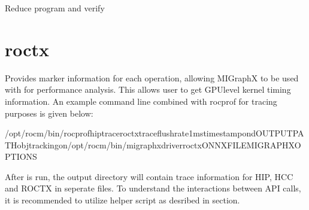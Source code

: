 \documentclass[letterpaper,10pt,english]{sphinxmanual}
\begin{document}
\begin{fulllineitems}
\label{\detokenize{driver:cmdoption-migraphx-driver-verify-r}}
\end{fulllineitems}


\sphinxAtStartPar
Reduce program and verify


\section{roctx}
\label{\detokenize{driver:roctx}}
\sphinxAtStartPar
Provides marker information for each operation, allowing MIGraphX to be used with  for performance analysis.
This allows user to get GPU\sphinxhyphen{}level kernel timing information.
An example command line combined with rocprof for tracing purposes is given below:

\begin{sphinxVerbatim}[commandchars=\\\{\}]
/opt/rocm/bin/rocprof\PYGZhy{}\PYGZhy{}hip\PYGZhy{}trace\PYGZhy{}\PYGZhy{}roctx\PYGZhy{}trace\PYGZhy{}\PYGZhy{}flush\PYGZhy{}rate1ms\PYGZhy{}\PYGZhy{}timestampon\PYGZhy{}d\PYGZlt{}OUTPUT\PYGZus{}PATH\PYGZgt{}\PYGZhy{}\PYGZhy{}obj\PYGZhy{}trackingon/opt/rocm/bin/migraphx\PYGZhy{}driverroctx\PYGZlt{}ONNX\PYGZus{}FILE\PYGZgt{}\PYGZlt{}MIGRAPHX\PYGZus{}OPTIONS\PYGZgt{}
\end{sphinxVerbatim}

\sphinxAtStartPar
After  is run, the output directory will contain trace information for HIP, HCC and ROCTX in seperate  files.
To understand the interactions between API calls, it is recommended to utilize  helper script as desribed in  section.
\end{document}
